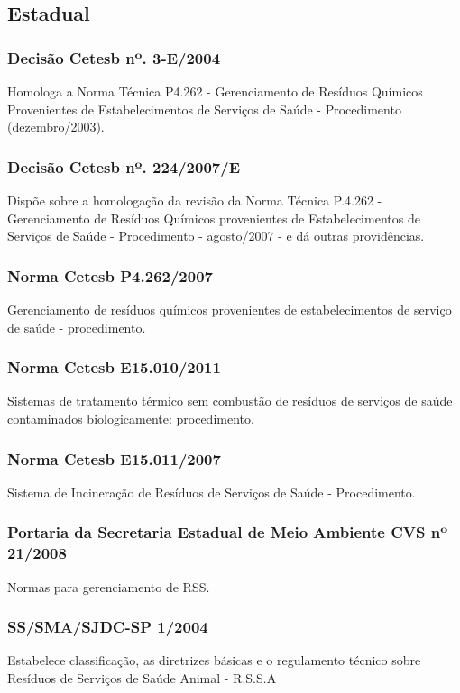 \begin{subapend}
	\subsection{Estadual}
	\begin{subsubapend}
		\subsubsection{Decisão Cetesb nº. 3-E/2004}
		Homologa a Norma Técnica P4.262 - Gerenciamento de Resíduos Químicos Provenientes de Estabelecimentos de Serviços de Saúde - Procedimento (dezembro/2003).
		\subsubsection{Decisão Cetesb nº. 224/2007/E}
		Dispõe sobre a homologação da revisão da Norma Técnica P.4.262 - Gerenciamento de Resíduos Químicos provenientes de Estabelecimentos de Serviços de Saúde - Procedimento - agosto/2007 - e dá outras providências.
		\subsubsection{Norma Cetesb P4.262/2007}
		Gerenciamento de resíduos químicos provenientes de estabelecimentos de serviço de saúde - procedimento.
		\subsubsection{Norma Cetesb E15.010/2011}
		Sistemas de tratamento térmico sem combustão de resíduos de serviços de saúde contaminados biologicamente: procedimento.
		\subsubsection{Norma Cetesb E15.011/2007}
		Sistema de Incineração de Resíduos de Serviços de Saúde - Procedimento.
		\subsubsection{Portaria da Secretaria Estadual de Meio Ambiente  CVS nº 21/2008}
		Normas para gerenciamento de RSS.
		\subsubsection{SS/SMA/SJDC-SP 1/2004}
		Estabelece classificação, as diretrizes básicas e o regulamento técnico sobre Resíduos de Serviços de Saúde Animal - R.S.S.A

\end{subsubapend}
\end{subapend}
